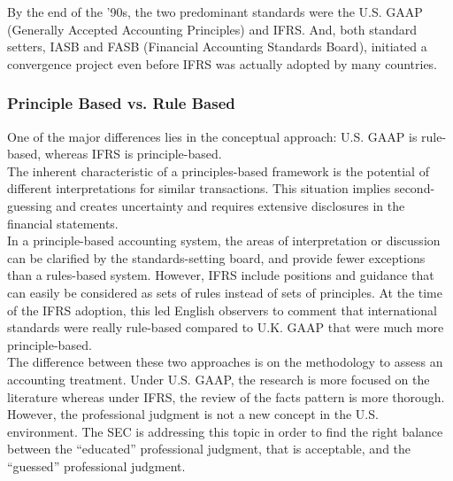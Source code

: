 By the end of the ’90s, the two predominant standards were the U.S. GAAP (Generally Accepted Accounting Principles) and IFRS. And, both standard setters, IASB and FASB (Financial Accounting Standards Board), initiated a convergence project even before IFRS was actually adopted by many countries. \\

\subsubsection{Principle Based vs. Rule Based}
One of the major differences lies in the conceptual approach: U.S. GAAP is rule-based, whereas IFRS is principle-based. \\

The inherent characteristic of a principles-based framework is the potential of different interpretations for similar transactions. This situation implies second-guessing and creates uncertainty and requires extensive disclosures in the financial statements. \\

In a principle-based accounting system, the areas of interpretation or discussion can be clarified by the standards-setting board, and provide fewer exceptions than a rules-based system. However, IFRS include positions and guidance that can easily be considered as sets of rules instead of sets of principles. At the time of the IFRS adoption, this led English observers to comment that international standards were really rule-based compared to U.K. GAAP that were much more principle-based. \\

The difference between these two approaches is on the methodology to assess an accounting treatment. Under U.S. GAAP, the research is more focused on the literature whereas under IFRS, the review of the facts pattern is more thorough. \\

However, the professional judgment is not a new concept in the U.S. environment. The SEC is addressing this topic in order to find the right balance between the “educated” professional judgment, that is acceptable, and the “guessed” professional judgment. \\

